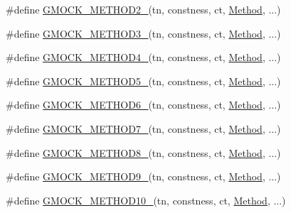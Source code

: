 \begin{DoxyCompactItemize}
\#define \hyperlink{gmock-generated-function-mockers_8h_a885295ca6bebb15efb3fc786218c5d47}{G\+M\+O\+C\+K\+\_\+\+M\+E\+T\+H\+O\+D2\+\_\+}(tn,  constness,  ct,  \hyperlink{gmock-spec-builders__test_8cc_a95606368148f3e5aab5db46c32466afd}{Method}, ...)
\item 
\#define \hyperlink{gmock-generated-function-mockers_8h_af7c77ba511c631de02bb8c45a6ed3045}{G\+M\+O\+C\+K\+\_\+\+M\+E\+T\+H\+O\+D3\+\_\+}(tn,  constness,  ct,  \hyperlink{gmock-spec-builders__test_8cc_a95606368148f3e5aab5db46c32466afd}{Method}, ...)
\item 
\#define \hyperlink{gmock-generated-function-mockers_8h_ab6430f2cfad9de4aca5258ea559294bb}{G\+M\+O\+C\+K\+\_\+\+M\+E\+T\+H\+O\+D4\+\_\+}(tn,  constness,  ct,  \hyperlink{gmock-spec-builders__test_8cc_a95606368148f3e5aab5db46c32466afd}{Method}, ...)
\item 
\#define \hyperlink{gmock-generated-function-mockers_8h_a9e3ecd392499ab19a4a6d3adcabf56f6}{G\+M\+O\+C\+K\+\_\+\+M\+E\+T\+H\+O\+D5\+\_\+}(tn,  constness,  ct,  \hyperlink{gmock-spec-builders__test_8cc_a95606368148f3e5aab5db46c32466afd}{Method}, ...)
\item 
\#define \hyperlink{gmock-generated-function-mockers_8h_ad0ca7f6973a076d0af4c953f8ed91842}{G\+M\+O\+C\+K\+\_\+\+M\+E\+T\+H\+O\+D6\+\_\+}(tn,  constness,  ct,  \hyperlink{gmock-spec-builders__test_8cc_a95606368148f3e5aab5db46c32466afd}{Method}, ...)
\item 
\#define \hyperlink{gmock-generated-function-mockers_8h_ab98a8399ba62b53b375c2807f4d39d2f}{G\+M\+O\+C\+K\+\_\+\+M\+E\+T\+H\+O\+D7\+\_\+}(tn,  constness,  ct,  \hyperlink{gmock-spec-builders__test_8cc_a95606368148f3e5aab5db46c32466afd}{Method}, ...)
\item 
\#define \hyperlink{gmock-generated-function-mockers_8h_aa84a36427c44505207b7cad5dec7ad67}{G\+M\+O\+C\+K\+\_\+\+M\+E\+T\+H\+O\+D8\+\_\+}(tn,  constness,  ct,  \hyperlink{gmock-spec-builders__test_8cc_a95606368148f3e5aab5db46c32466afd}{Method}, ...)
\item 
\#define \hyperlink{gmock-generated-function-mockers_8h_aa820171a19cc587c247dbe05cbffc55f}{G\+M\+O\+C\+K\+\_\+\+M\+E\+T\+H\+O\+D9\+\_\+}(tn,  constness,  ct,  \hyperlink{gmock-spec-builders__test_8cc_a95606368148f3e5aab5db46c32466afd}{Method}, ...)
\item 
\#define \hyperlink{gmock-generated-function-mockers_8h_a81a48223a8771de36ef92ac6d56f6e81}{G\+M\+O\+C\+K\+\_\+\+M\+E\+T\+H\+O\+D10\+\_\+}(tn,  constness,  ct,  \hyperlink{gmock-spec-builders__test_8cc_a95606368148f3e5aab5db46c32466afd}{Method}, ...)

\end{DoxyCompactItemize}
